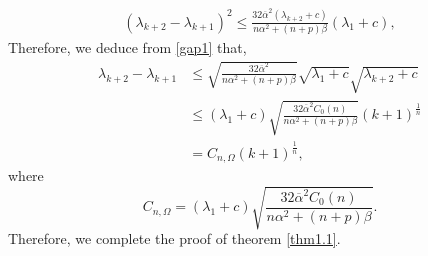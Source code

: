 \documentclass[12pt]{article}
\numberwithin{equation}{section}
\begin{document}
\begin{equation}\begin{aligned}\label{gap1}\left(\lambda_{k+2}-\lambda_{k+1}\right)^{2}
\leq\frac{32\overline{\alpha}^{2}(\lambda_{k+2}+c)}{n\alpha^{2}+(n+p)\beta}\left(\lambda_{1}+c\right)
,
\end{aligned}\end{equation}
Therefore, we deduce from \eqref{gap1} that,
\begin{equation*}\begin{aligned}\lambda_{k+2}-\lambda_{k+1}&\leq
\sqrt{\frac{32\overline{\alpha}^{2}}{n\alpha^{2}+(n+p)\beta}}\sqrt{\lambda_{1}+c}\sqrt{\lambda_{k+2}+c}\\&\leq
(\lambda_{1}+c)\sqrt{\frac{32\overline{\alpha}^{2}C_{0}(n)}{n\alpha^{2}+(n+p)\beta}}(k+1)^{\frac{1}{n}}
\\&=C_{n,\Omega}(k+1)^{\frac{1}{n}},\end{aligned}
\end{equation*}
where $$C_{n,\Omega}=(\lambda_{1}+c)\sqrt{\frac{32\overline{\alpha}^{2}C_{0}(n)}{n\alpha^{2}+(n+p)\beta}}.$$
Therefore, we complete the proof of theorem \ref{thm1.1}.
\end{document}

